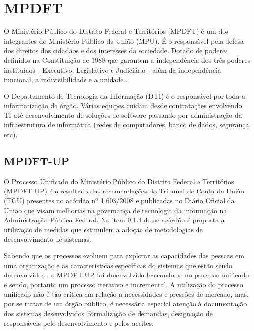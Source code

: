 \documentclass[
	article,			%
	11pt,				%
	oneside,			%
	a4paper,			%
	english,			%
	brazil,				%
	sumario=tradicional
	]{abntex2}
\begin{document}



\section{MPDFT}

\label{mpdft}

O Ministério Público do Distrito Federal e Territórios (MPDFT) é um dos
integrantes do Ministério Público da União (MPU). É o responsável pela defesa
dos direitos dos cidadãos e dos interesses da sociedade. Dotado de poderes
definidos na Constituição de 1988 que garantem a independência dos três poderes
instituídos - Executivo, Legislativo e Judiciário - além da independência
funcional, a indivisibilidade e a unidade \cite{mpdft}.

O Departamento de Tecnologia da Informação (DTI) é o responsável por toda a
informatização do órgão. Várias equipes cuidam desde contratações envolvendo TI
até desenvolvimento de soluções de software passando por administração da
infraestrutura de informática (redes de computadores, banco de dados, segurança
etc).

\subsection{MPDFT-UP}

O Processo Unificado do Ministério Público do Distrito Federal e Territórios
(MPDFT-UP) \cite{mpdft-up} é o resultado das recomendações do Tribunal de Conta
da União (TCU) presentes no acórdão nº 1.603/2008 \cite{acordao-tcu-1603-2008}
e publicadas no Diário Oficial da União \cite{dou-20080818} que visam melhorias
na governança de tecnologia da informação na Administração Pública Federal. No
item 9.1.4 desse acórdão é proposta a utilização de medidas que estimulem a
adoção de metodologias de desenvolvimento de sistemas.

Sabendo que os processos evoluem para explorar as capacidades das pessoas em uma
organização e as características específicas do sistemas que estão sendo
desenvolvidos \cite{sommerville2007}, o MPDFT-UP foi desenvolvido baseando-se
no processo unificado e sendo, portanto um processo iterativo e incremental. A
utilização do processo unificado não é tão crítica em relação a necessidades e
pressões de mercado, mas, por se tratar de um órgão público, é necessária
especial atenção à documentação dos sistemas desenvolvidos, formalização de
demandas, designação de responsáveis pelo desenvolvimento e pelos aceites.
\end{document}
